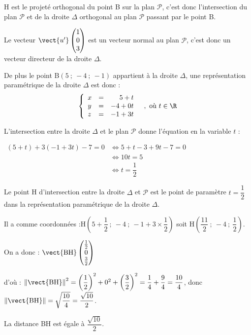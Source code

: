H est le projeté orthogonal du point B sur la plan $\mathcal{P}$, c'est donc l'intersection du plan $\mathcal{P}$ et de la droite $\Delta$ orthogonal au plan $\mathcal{P}$ passant par le point B.

Le vecteur $\vect{u'}\begin{pmatrix}1\\0\\3\end{pmatrix}$ est un vecteur normal au plan $\mathcal{P}$, c'est donc un vecteur directeur de la droite $\Delta$.

De plus le point B$(5~;~-4~;~-1)$ appartient à la droite $\Delta$, une représentation paramétrique de la droite $\Delta$ est donc :
\[\left\{\begin{array}{lcr}
x&=&\phantom{-}5+t \\
y&=&-4 + 0t \\
z&=&-1+3t
\end{array} \quad, \text { où } t \in \R\right.\]

L'intersection entre la droite $\Delta$ et le plan $\mathcal{P}$ donne l'équation en la variable $t$ :

$\begin{aligned} (5+t)+3(-1+3t)-7=0 &\iff 5+t-3+9t-7=0\\
	& \iff 10t=5\\
	& \iff t=\dfrac{1}{2}
\end{aligned}$

Le point H d'intersection entre la droite $\Delta$ et $\mathcal{P}$ est le point de paramètre  $ t=\dfrac{1}{2}$ dans la représentation paramétrique de la droite $\Delta$.

Il a comme coordonnées :\quad$\mathrm{H}\left(5 + \dfrac{1}{2}~;~-4~;~-1 + 3 \times\dfrac{1}{2}\right)$ soit $\mathrm{H}\left(\dfrac{11}{2}~;~-4~;~\dfrac{1}{2}\right)$.

On a donc : $\vect{\mathrm{BH}}\begin{pmatrix}\frac{1}{2}\\0\\\frac{3}{2}\end{pmatrix}$

d'où : $\left\|\vect {\mathrm{BH}}\right\|^2=\left(\dfrac{1}{2}\right)^2+0^2+\left(\dfrac{3}{2}\right)^2=\dfrac{1}{4}+\dfrac{9}{4}=\dfrac{10}{4}$, donc $\left\|\vect {\mathrm{BH}}\right\|=\sqrt{\dfrac{10}{4}}=\dfrac{\sqrt{10}}{2}$.

La distance BH est égale à $\dfrac{\sqrt{10}}{2}$.
